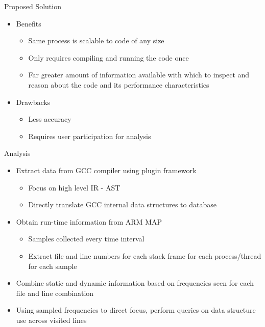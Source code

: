 \documentclass[final]{beamer}
\let\olditem\item
\renewcommand{\item}{\vspace{\fill}\olditem}
\begin{document}
\begin{frame}{\hspace{0.02\paperwidth}Proposed Solution}
\begin{itemize}
\item Benefits
\begin{itemize}
\item Same process is scalable to code of any size
\item Only requires compiling and running the code once
\item Far greater amount of information available with which to inspect and reason about the code and its performance characteristics
\end{itemize}
\item Drawbacks
\begin{itemize}
\item Less accuracy
\item Requires user participation for analysis
\end{itemize}
\end{itemize}
\end{frame}

\begin{frame}{\hspace{0.02\paperwidth}Analysis}
\begin{itemize}
\item Extract data from \acs{GCC} compiler using plugin framework
\begin{itemize}
\item Focus on high level \acs{IR} - \acs{AST}
\item Directly translate \acs{GCC} internal data structures to database
\end{itemize}
\item Obtain run-time information from ARM MAP
\begin{itemize}
\item Samples collected every time interval
\item Extract file and line numbers for each stack frame for each process/thread for each sample
\end{itemize}
\item Combine static and dynamic information based on frequencies seen for each file and line combination
\item Using sampled frequencies to direct focus, perform queries on data structure use across visited lines
\end{itemize}
\end{frame}
\end{document}
